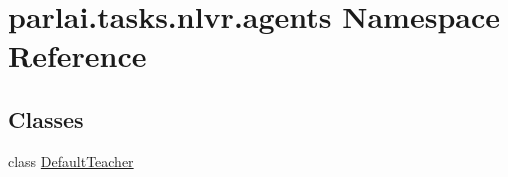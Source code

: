 \hypertarget{namespaceparlai_1_1tasks_1_1nlvr_1_1agents}{}\section{parlai.\+tasks.\+nlvr.\+agents Namespace Reference}
\label{namespaceparlai_1_1tasks_1_1nlvr_1_1agents}
\subsection*{Classes}
\begin{DoxyCompactItemize}
\item 
class \hyperlink{classparlai_1_1tasks_1_1nlvr_1_1agents_1_1DefaultTeacher}{Default\+Teacher}
\end{DoxyCompactItemize}
